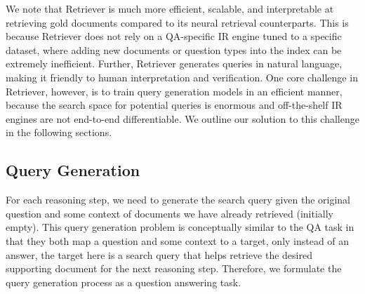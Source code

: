 We note that \golden{} Retriever is much more efficient, scalable, and interpretable at retrieving gold documents compared to its neural retrieval counterparts.
This is because \golden{} Retriever does not rely on a QA-specific IR engine tuned to a specific dataset, where adding new documents or question types into the index can be extremely inefficient.
Further, \golden{} Retriever generates queries in natural language, making it friendly to human interpretation and verification.
One core challenge in \golden{} Retriever, however, is to train query generation models in an efficient manner, because the search space for potential queries is enormous and off-the-shelf IR engines are not end-to-end differentiable.
We outline our solution to this challenge in the following sections.

\subsection{Query Generation}

\begin{table*}
    \centering
    \caption{Example oracle queries on the \hotpotqa{} dev set.}
    \label{tab:oracle_examples}
\end{table*}

For each reasoning step, we need to generate the search query given the original question  and some context of documents we have already retrieved (initially empty).
This query generation problem is conceptually similar to the QA task in that they both map a question and some context to a target, only instead of an answer, the target here is a search query that helps retrieve the desired supporting document for the next reasoning step.
Therefore, we formulate the query generation process as a question answering task.

